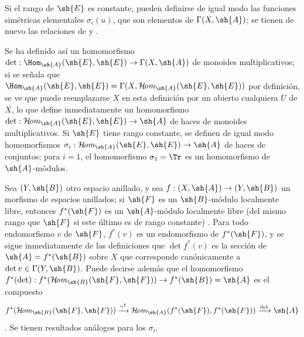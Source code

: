 \documentclass[oneside,10pt]{amsart}
\makeatletter
\newcommand{\ega@arrow}[2]{\mathchoice{#1}{#2}{#2}{#2}}
\renewcommand{\to}{\ega@arrow{\longrightarrow}{\rightarrow}}
\def\shHom{\mathcal{H}\!\mathit{om}}
\newcommand{\oldpage}[2][]{\marginnote{\normalfont\footnotesize\textbf{#1}~|~#2}\ignorespaces}
\makeatother
\begin{document}
\begin{env}[6.4.8]
Si el rango de $\sh{E}$ es constante, pueden definirse de igual modo las funciones simétricas elementales $\sigma_i(u)$, que son elementos de $\Gamma(X,\sh{A})$;
se tienen de nuevo las relaciones de  y .

\oldpage[II]{124}
Se ha definido así un homomorfismo $\det:\Hom_{\sh{A}}(\sh{E},\sh{E})\to\Gamma(X,\sh{A})$ de monoides multiplicativos;
si se señala que $\Hom_{\sh{A}}(\sh{E},\sh{E})=\Gamma(X,\shHom_{\sh{A}}(\sh{E},\sh{E}))$ por definición, se ve que puede reemplazarse $X$ en esta definición por un abierto cualquiera $U$ de $X$, lo que define inmediatamente un homomorfismo $\det:\shHom_{\sh{A}}(\sh{E},\sh{E})\to\sh{A}$ de haces de monoides multiplicativos.
Si $\sh{E}$ tiene rango constante, se definen de igual modo homomorfismos $\sigma_i:\shHom_{\sh{A}}(\sh{E},\sh{E})\to\sh{A}$ de haces de conjuntos;
para $i=1$, el homomorfismo $\sigma_1=\Tr$ es un homomorfismo de $\sh{A}$-módulos.

Sea $(Y,\sh{B})$ otro espacio anillado, y sea $f:(X,\sh{A})\to(Y,\sh{B})$ un morfismo de espacios anillados;
si $\sh{F}$ es un $\sh{B}$-módulo localmente libre, entonces $f^*(\sh{F})$ es un $\sh{A}$-módulo localmente libre (del mismo rango que $\sh{F}$ si este último es de rango constante) .
Para todo endomorfismo $v$ de $\sh{F}$, $f^*(v)$ es un endomorfismo de $f^*(\sh{F})$, y se sigue inmediatamente de las definiciones que $\det f^*(v)$ es la sección de $\sh{A}=f^*(\sh{B})$ sobre $X$ que corresponde canónicamente a $\det v\in\Gamma(Y,\sh{B})$.
Puede decirse además que el homomorfismo $f^*(\det):f^*(\shHom_{\sh{B}}(\sh{F},\sh{F}))\to f^*(\sh{B})=\sh{A}$ es el compuesto
\[
  f^*(\shHom_{\sh{B}}(\sh{F},\sh{F}))
  \xrightarrow{\gamma^\sharp} \shHom_{\sh{A}}(f^*(\sh{F}),f^*(\sh{F}))
  \xrightarrow{\det} \sh{A}
\]
.
Se tienen resultados análogos para los $\sigma_i$.
\end{env}
\end{document}
